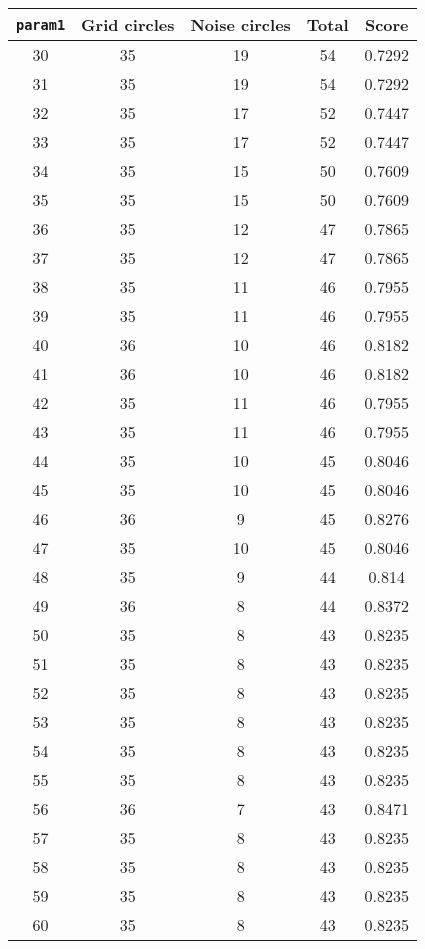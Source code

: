 \documentclass[letterpaper, 12pt]{article}
\begin{document}
\begin{longtable}{|c|c|c|c|c|}
\hline
\textbf{\texttt{param1}} & \textbf{Grid circles} & \textbf{Noise circles} & \textbf{Total} & \textbf{Score} \\
\hline
30 & 35 & 19 & 54 & 0.7292 \\
\hline
31 & 35 & 19 & 54 & 0.7292 \\
\hline
32 & 35 & 17 & 52 & 0.7447 \\
\hline
33 & 35 & 17 & 52 & 0.7447 \\
\hline
34 & 35 & 15 & 50 & 0.7609 \\
\hline
35 & 35 & 15 & 50 & 0.7609 \\
\hline
36 & 35 & 12 & 47 & 0.7865 \\
\hline
37 & 35 & 12 & 47 & 0.7865 \\
\hline
38 & 35 & 11 & 46 & 0.7955 \\
\hline
39 & 35 & 11 & 46 & 0.7955 \\
\hline
40 & 36 & 10 & 46 & 0.8182 \\
\hline
41 & 36 & 10 & 46 & 0.8182 \\
\hline
42 & 35 & 11 & 46 & 0.7955 \\
\hline
43 & 35 & 11 & 46 & 0.7955 \\
\hline
44 & 35 & 10 & 45 & 0.8046 \\
\hline
45 & 35 & 10 & 45 & 0.8046 \\
\hline
46 & 36 & 9 & 45 & 0.8276 \\
\hline
47 & 35 & 10 & 45 & 0.8046 \\
\hline
48 & 35 & 9 & 44 & 0.814 \\
\hline
49 & 36 & 8 & 44 & 0.8372 \\
\hline
50 & 35 & 8 & 43 & 0.8235 \\
\hline
51 & 35 & 8 & 43 & 0.8235 \\
\hline
52 & 35 & 8 & 43 & 0.8235 \\
\hline
53 & 35 & 8 & 43 & 0.8235 \\
\hline
54 & 35 & 8 & 43 & 0.8235 \\
\hline
55 & 35 & 8 & 43 & 0.8235 \\
\hline
56 & 36 & 7 & 43 & 0.8471 \\
\hline
57 & 35 & 8 & 43 & 0.8235 \\
\hline
58 & 35 & 8 & 43 & 0.8235 \\
\hline
59 & 35 & 8 & 43 & 0.8235 \\
\hline
60 & 35 & 8 & 43 & 0.8235 \\

\end{longtable}
\end{document}
